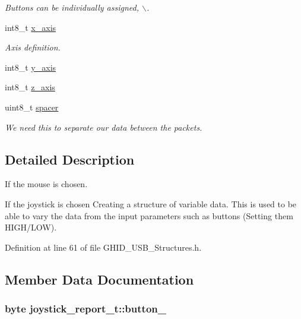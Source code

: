 \begin{DoxyCompactItemize}
\begin{tabbing}
\end{tabbing}\begin{DoxyCompactList}\small\item\em \-Buttons can be individually assigned, $\backslash$. \end{DoxyCompactList}\item 
int8\-\_\-t \hyperlink{structjoystick__report__t_a00eddcf4aba7402e3f0fdd1e7ab09d13}{x\-\_\-axis}
\begin{DoxyCompactList}\small\item\em \-Axis definition. \end{DoxyCompactList}\item 
int8\-\_\-t \hyperlink{structjoystick__report__t_a6abec4aa980f7c029aaaa216c448e7af}{y\-\_\-axis}
\item 
int8\-\_\-t \hyperlink{structjoystick__report__t_ab213b4d95036f350509ba4e4f056ca97}{z\-\_\-axis}
\item 
uint8\-\_\-t \hyperlink{structjoystick__report__t_a4b7eb53cb199dc64ceea758f0baacbcc}{spacer}
\begin{DoxyCompactList}\small\item\em \-We need this to separate our data between the packets. \end{DoxyCompactList}\end{DoxyCompactItemize}


\subsection{\-Detailed \-Description}
\-If the mouse is chosen. 

\-If the joystick is chosen \-Creating a structure of variable data. \-This is used to be able to vary the data from the input parameters such as buttons (\-Setting them \-H\-I\-G\-H/\-L\-O\-W). 

\-Definition at line 61 of file \-G\-H\-I\-D\-\_\-\-U\-S\-B\-\_\-\-Structures.\-h.



\subsection{\-Member \-Data \-Documentation}
\hypertarget{structjoystick__report__t_a886edb5222b7c842f1c2f80e65cb301f}{
\subsubsection[{button\-\_\-1}]{\setlength{\rightskip}{0pt plus 5cm}byte {\bf joystick\-\_\-report\-\_\-t\-::button\-\_}}}\label{structjoystick__report__t_a886edb5222b7c842f1c2f80e65cb301f}


